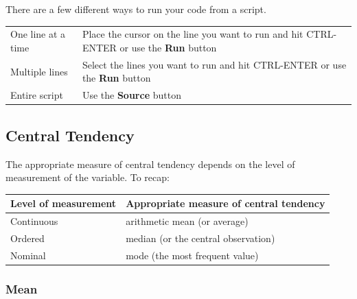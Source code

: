 \documentclass[]{book}
\theoremstyle{definition}
\theoremstyle{definition}
\theoremstyle{definition}
\theoremstyle{remark}
\begin{document}
There are a few different ways to run your code from a script.

\begin{longtable}[]{@{}ll@{}}
\toprule
\begin{minipage}[t]{0.24\columnwidth}\raggedright\strut
One line at a time\strut
\end{minipage} & \begin{minipage}[t]{0.70\columnwidth}\raggedright\strut
Place the cursor on the line you want to run and hit CTRL-ENTER or use
the \textbf{Run} button\strut
\end{minipage}\tabularnewline
\begin{minipage}[t]{0.24\columnwidth}\raggedright\strut
Multiple lines\strut
\end{minipage} & \begin{minipage}[t]{0.70\columnwidth}\raggedright\strut
Select the lines you want to run and hit CTRL-ENTER or use the
\textbf{Run} button\strut
\end{minipage}\tabularnewline
\begin{minipage}[t]{0.24\columnwidth}\raggedright\strut
Entire script\strut
\end{minipage} & \begin{minipage}[t]{0.70\columnwidth}\raggedright\strut
Use the \textbf{Source} button\strut
\end{minipage}\tabularnewline
\bottomrule
\end{longtable}

\subsection{Central Tendency}\label{central-tendency}

The appropriate measure of central tendency depends on the level of
measurement of the variable. To recap:

\begin{longtable}[]{@{}ll@{}}
\toprule
Level of measurement & Appropriate measure of central
tendency\tabularnewline
\midrule
\endhead
Continuous & arithmetic mean (or average)\tabularnewline
Ordered & median (or the central observation)\tabularnewline
Nominal & mode (the most frequent value)\tabularnewline
\bottomrule
\end{longtable}

\subsubsection{Mean}\label{mean}
\end{document}
